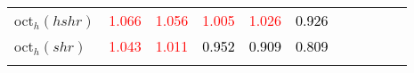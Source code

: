 \begin{tabular}[t]{l|>{}cccc>{}c|ccccc}
oct$_h(hshr)$ & \textcolor{red}{1.066} & \textcolor{red}{1.056} & \textcolor{red}{1.005} & \textcolor{red}{1.026} & \textcolor{black}{0.926} &  &  &  &  & \\
oct$_h(shr)$ & \textcolor{red}{1.043} & \textcolor{red}{1.011} & \textcolor{black}{0.952} & \textcolor{black}{0.909} & \textcolor{black}{0.809} &  &  &  &  & \\
\bottomrule
{}\\
\end{tabular}
